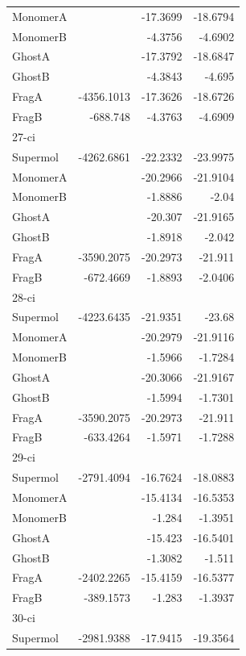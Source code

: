 \documentclass[journal=jctcce,manuscript=article]{achemso}
\begin{document}
\begin{spacing}{1}
\begin{longtable}{lRRR}
    MonomerA &       & -17.3699 & -18.6794 \\
    MonomerB &       & -4.3756 & -4.6902 \\
    GhostA &       & -17.3792 & -18.6847 \\
    GhostB &       & -4.3843 & -4.695 \\
    FragA & -4356.1013 & -17.3626 & -18.6726 \\
    FragB & -688.748 & -4.3763 & -4.6909 \\
    27-ci &       &       &  \\
    Supermol & -4262.6861 & -22.2332 & -23.9975 \\
    MonomerA &       & -20.2966 & -21.9104 \\
    MonomerB &       & -1.8886 & -2.04 \\
    GhostA &       & -20.307 & -21.9165 \\
    GhostB &       & -1.8918 & -2.042 \\
    FragA & -3590.2075 & -20.2973 & -21.911 \\
    FragB & -672.4669 & -1.8893 & -2.0406 \\
    28-ci &       &       &  \\
    Supermol & -4223.6435 & -21.9351 & -23.68 \\
    MonomerA &       & -20.2979 & -21.9116 \\
    MonomerB &       & -1.5966 & -1.7284 \\
    GhostA &       & -20.3066 & -21.9167 \\
    GhostB &       & -1.5994 & -1.7301 \\
    FragA & -3590.2075 & -20.2973 & -21.911 \\
    FragB & -633.4264 & -1.5971 & -1.7288 \\
    29-ci &       &       &  \\
    Supermol & -2791.4094 & -16.7624 & -18.0883 \\
    MonomerA &       & -15.4134 & -16.5353 \\
    MonomerB &       & -1.284 & -1.3951 \\
    GhostA &       & -15.423 & -16.5401 \\
    GhostB &       & -1.3082 & -1.511 \\
    FragA & -2402.2265 & -15.4159 & -16.5377 \\
    FragB & -389.1573 & -1.283 & -1.3937 \\
    30-ci &       &       &  \\
    Supermol & -2981.9388 & -17.9415 & -19.3564 \\

\end{longtable}
\end{spacing}
\end{document}
